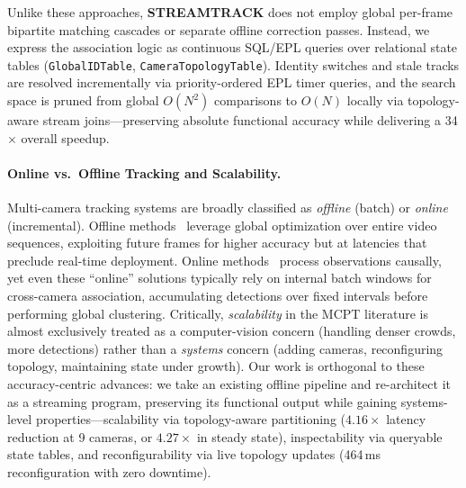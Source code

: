 \documentclass[11pt]{article}
\begin{document}
Unlike these approaches, \textbf{STREAMTRACK} does not employ global per-frame bipartite matching cascades or separate offline correction passes. Instead, we express the association logic as continuous SQL/EPL queries over relational state tables (\texttt{GlobalIDTable}, \texttt{CameraTopologyTable}). Identity switches and stale tracks are resolved incrementally via priority-ordered EPL timer queries, and the search space is pruned from global $O(N^2)$ comparisons to $O(N)$ locally via topology-aware stream joins---preserving absolute functional accuracy while delivering a 34$\times$ overall speedup.

\paragraph{Online vs.\ Offline Tracking and Scalability.}
Multi-camera tracking systems are broadly classified as \emph{offline} (batch) or \emph{online} (incremental). Offline methods~\cite{yoshida2024overlap} leverage global optimization over entire video sequences, exploiting future frames for higher accuracy but at latencies that preclude real-time deployment. Online methods~\cite{kim2024cluster,xie2024robust,specker2024ocmctrack} process observations causally, yet even these ``online'' solutions typically rely on internal batch windows for cross-camera association, accumulating detections over fixed intervals before performing global clustering. Critically, \emph{scalability} in the MCPT literature is almost exclusively treated as a computer-vision concern (handling denser crowds, more detections) rather than a \emph{systems} concern (adding cameras, reconfiguring topology, maintaining state under growth). Our work is orthogonal to these accuracy-centric advances: we take an existing offline pipeline and re-architect it as a streaming program, preserving its functional output while gaining systems-level properties---scalability via topology-aware partitioning ($4.16\times$ latency reduction at 9 cameras, or $4.27\times$ in steady state), inspectability via queryable state tables, and reconfigurability via live topology updates (464\,ms reconfiguration with zero downtime).
\end{document}

